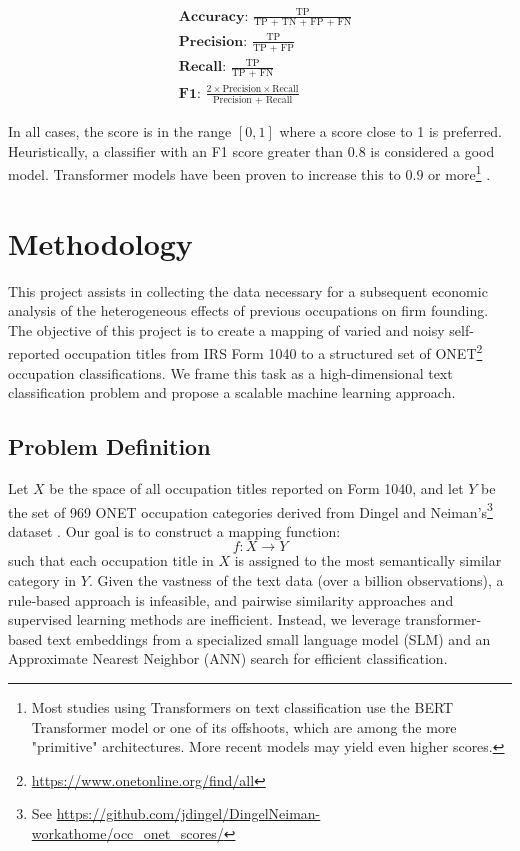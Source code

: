 \documentclass[12pt]{article}
\begin{document}
\begin{align*}
    &\textbf{Accuracy:  } \frac{\text{TP}}{\text{TP + TN + FP + FN}} \\
    & \textbf{Precision:  } \frac{\text{TP}}{\text{TP + FP}}\\
    &\textbf{Recall:  }\frac{\text{TP}}{\text{TP + FN}}\\
    &  \textbf{F1:  }  \frac{2 \times \text{Precision}\times \text{Recall}}{\text{Precision + Recall}}
\end{align*}

In all cases, the score is in the range $[0,1]$ where a score close to 1 is preferred. Heuristically, a classifier with an F1 score greater than $0.8$ is considered a good model. Transformer models have been proven to increase this to $0.9$ or more\footnote{Most studies using Transformers on text classification use the BERT Transformer model or one of its offshoots, which are among the more "primitive" architectures. More recent models may yield even higher scores.} \cite{lu2022comparative}\cite{transformer-text-class}\cite{gokhan-trans-text-class}. 

\section{Methodology}\label{sec:methodology}
This project assists in collecting the data necessary for a subsequent economic analysis of the heterogeneous effects of previous occupations on firm founding. The objective of this project is to create a mapping of varied and noisy self-reported occupation titles from IRS Form 1040 to a structured set of ONET\footnote{\href{https://www.onetonline.org/find/all}{https://www.onetonline.org/find/all}} occupation classifications. We frame this task as a high-dimensional text classification problem and propose a scalable machine learning approach.

\subsection{Problem Definition}

Let $X$ be the space of all occupation titles reported on Form 1040, and let $Y$ be the set of 969 ONET occupation categories derived from Dingel and Neiman's\footnote{See \href{https://github.com/jdingel/DingelNeiman-workathome/occ_onet_scores/output/occupations_workathome.csv}{https://github.com/jdingel/DingelNeiman-workathome/occ\_onet\_scores/}} dataset \cite{DINGEL2020} . 
Our goal is to construct a mapping function:
\[
f: X \to Y
\]
such that each occupation title in $X$ is assigned to the most semantically similar category in $Y$. Given the vastness of the text data (over a billion observations), a rule-based approach is infeasible, and pairwise similarity approaches and supervised learning methods are inefficient. Instead, we leverage transformer-based text embeddings from a specialized small language model (SLM) and an Approximate Nearest Neighbor (ANN) search for efficient classification.
\end{document}

